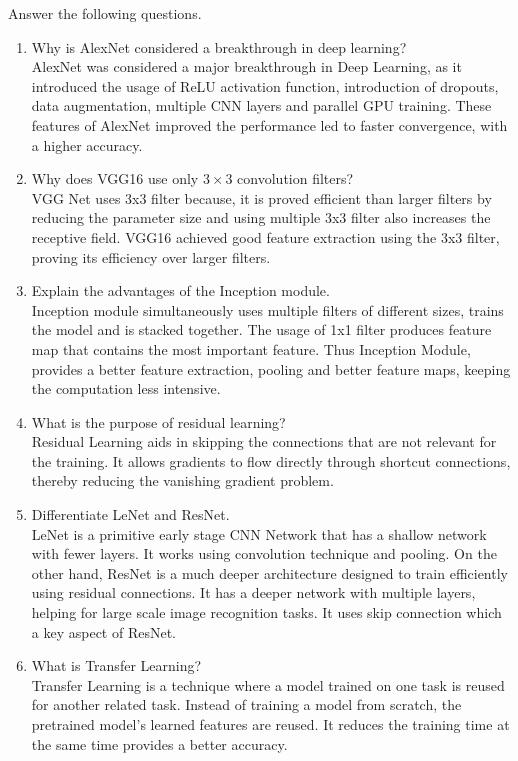\documentclass[11pt]{article}
\begin{document}
Answer the following questions.

\begin{enumerate}

\item Why is AlexNet considered a breakthrough in deep learning?\\
AlexNet was considered a major breakthrough in Deep Learning, as it introduced the usage of ReLU activation function, introduction of dropouts, data augmentation, multiple CNN layers and parallel GPU training. These features of AlexNet improved the performance led to faster convergence, with a higher accuracy.

\item Why does VGG16 use only $3\times3$ convolution filters?\\
VGG Net uses 3x3 filter because, it is proved efficient than larger filters by reducing the parameter size and using multiple 3x3 filter also increases the receptive field. VGG16 achieved good feature extraction using the 3x3 filter, proving its efficiency over larger filters.

\item Explain the advantages of the Inception module.\\
Inception module simultaneously uses multiple filters of different sizes, trains the model and is stacked together. The usage of 1x1 filter produces feature map that contains the most important feature. Thus Inception Module, provides a better feature extraction, pooling and better feature maps, keeping the computation less intensive.

\item What is the purpose of residual learning?\\
Residual Learning aids in skipping the connections that are not relevant for the training. It allows gradients to flow directly through shortcut connections, thereby reducing the vanishing gradient problem.

\item Differentiate LeNet and ResNet.\\
LeNet is a primitive early stage CNN Network that has a shallow network with fewer layers. It works using convolution technique and pooling. On the other hand, ResNet is a much deeper architecture designed to train efficiently using residual connections. It has a deeper network with multiple layers, helping for large scale image recognition tasks. It uses skip connection which a key aspect of ResNet.

\item What is Transfer Learning?\\
Transfer Learning is a technique where a model trained on one task is reused for another related task. Instead of training a model from scratch, the pretrained model's learned features are reused. It reduces the training time at the same time provides a better accuracy.


\end{enumerate}
\end{document}
